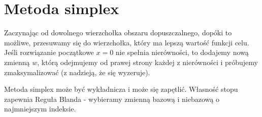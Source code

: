 \section{Metoda simplex}
Zaczynając od dowolnego wierzchołka obszaru dopuszczalnego, dopóki to możliwe, przesuwamy się do wierzchołka, który ma lepszą wartość funkcji celu. Jeśli rozwiązanie początkowe \( x = 0 \) nie spełnia nierówności, to dodajemy nową zmienną \( w \), którą odejmujemy od prawej strony każdej z nierówności i próbujemy zmaksymalizować (z nadzieją, że się wyzeruje).
\begin{warning}
    Metoda simplex może być wykładnicza i może się zapętlić. Własność stopu zapewnia Reguła Blanda - wybieramy zmienną bazową i niebazową o najmniejszym indeksie.
\end{warning}